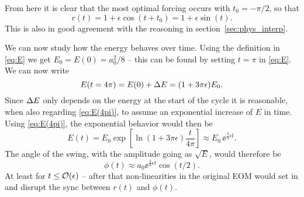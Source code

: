 \documentclass[11pt,letter, swedish, english,%
]{article}
\begin{document}

From here it is clear that the most optimal forcing occurs with
$t_0=-\pi/2$, so that
\begin{equation}\label{eq:r}
r(t)=1+\epsilon\cos(t+t_0)=1+\epsilon\sin(t).
\end{equation}
This is also in good agreement with the reasoning in
section~\ref{sec:phys_interp}.

We can now study how the energy behaves over time. Using the
definition in \eqref{eq:E} we get $E_0=E(0)=a_0^2/8$ -- this can be
found by setting $t=\pi$ in \eqref{eq:E}. We can now write
\begin{equation}\label{eq:E(4pi)}
E(t=4\pi)=E(0)+\Delta{E}=(1+3\pi\epsilon)E_0.
\end{equation}
Since $\Delta{E}$ only depends on the energy at the start of the cycle it is
reasonable, when also regarding \eqref{eq:E(4pi)}, to assume an
exponential increase of $E$ in time. Using \eqref{eq:E(4pi)}, the
exponential behavior would then be
\begin{equation}\label{eq:E(t)}
E(t)=E_0\exp[\ln(1+3\pi\epsilon)\frac{t}{4\pi}]
\approx E_0\,\ee^{\frac{3}{4}\epsilon t}.
\end{equation}
The angle of the swing, with the amplitude going as
$\sqrt{E}$, would therefore be 
\begin{equation}\label{eq:phi_from_E}
\phi(t)\approx a_0\ee^{\frac{3}{8}\epsilon t}\cos(t/2).
\end{equation}
At least for $t\le\order{\epsilon}$ -- after that non-linearities in the
original EOM would set in and disrupt the sync between $r(t)$ and
$\phi(t)$. 




\end{document}
